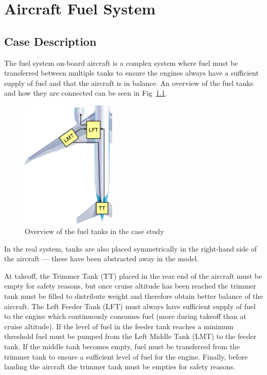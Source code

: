 \chapter{Aircraft Fuel System}
\label{chap:fuelSystem}

\section{Case Description}

The fuel system on-board aircraft is a complex system where fuel must
be transferred between multiple tanks to ensure the engines always have
a sufficient supply of fuel and that the aircraft is in balance. An
overview of the fuel tanks and how they are connected can be seen in
Fig~\ref{fig:fuelTanks}.

\begin{figure}[!ht]
\centering
\includegraphics[width=4.5cm]{fuelSystem/FuelTanks.png}
\caption{Overview of the fuel tanks in the case
  study \label{fig:fuelTanks}}
\end{figure}

In the real system, tanks are also placed symmetrically in the
right-hand side of the aircraft --- these have been abstracted away in
the model.

At takeoff, the Trimmer Tank (TT) placed in the rear end of the
aircraft must be empty for safety reasons, but once cruise altitude
has been reached the trimmer tank must be filled to distribute weight
and therefore obtain better balance of the aircraft. The Left Feeder
Tank (LFT) must always have sufficient supply of fuel to the engine
which continuously consumes fuel (more during takeoff than at cruise
altitude). If the level of fuel in the feeder tank reaches a minimum
threshold fuel must be pumped from the Left Middle Tank (LMT) to the
feeder tank. If the middle tank becomes empty, fuel must be transferred
from the trimmer tank to ensure a sufficient level of fuel for the
engine. Finally, before landing the aircraft the trimmer tank must be
empties for safety reasons.


